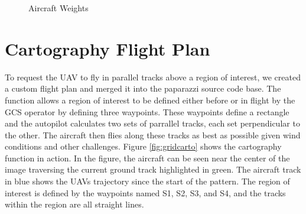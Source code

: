 \documentclass[a4paper,11pt]{report}
\begin{document}
\begin{figure}[ht]
  \centering
  \caption{Aircraft Weights}
  \label{fig:weights}
\end{figure} 

\section{Cartography Flight Plan}

To request the UAV to fly in parallel tracks above a region of interest, we created a custom flight plan and merged it into the paparazzi source code base. The function allows a region of interest to be defined either before or in flight by the GCS operator by defining three waypoints. These waypoints define a rectangle and the autopilot calculates two sets of parrallel tracks, each set perpendicular to the other. The aircraft then flies along these tracks as best as possible given wind conditions and other challenges. Figure \ref{fig:gridcarto} shows the cartography function in action. In the figure, the aircraft can be seen near the center of the image traversing the current ground track highlighted in green. The aircraft track in blue shows the UAVs trajectory since the start of the pattern. The region of interest is defined by the waypoints named S1, S2, S3, and S4, and the tracks within the region are all straight lines.
\end{document}
